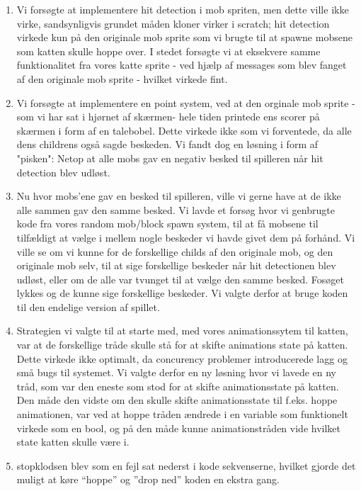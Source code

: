 \documentclass[12pt, a4paper, hidelinks]{article}
\begin{document}
\begin{enumerate}

\item Vi forsøgte at implementere hit detection i mob spriten, men dette ville ikke virke, sandsynligvis grundet måden kloner virker i scratch; hit detection virkede kun på den originale mob sprite som vi brugte til at spawne mobsene som katten skulle hoppe over. I stedet forsøgte vi at eksekvere samme funktionalitet fra vores katte sprite  - ved hjælp af messages som blev fanget af den originale mob sprite - hvilket virkede fint. 


\item Vi forsøgte at implementere en point system, ved at den orginale mob sprite - som vi har sat i hjørnet af skærmen-  hele tiden printede ens scorer på skærmen i form af en talebobel. Dette virkede ikke som vi forventede, da alle dens childrens også sagde beskeden. Vi fandt dog en løsning i form af "pisken": Netop at alle mobs gav en negativ besked til spilleren når hit detection blev udløst.


\item Nu hvor mobs'ene gav en besked til spilleren, ville vi gerne have at de ikke alle sammen gav den samme besked. Vi lavde et forsøg hvor vi genbrugte kode fra vores random mob/block spawn system, til at få mobsene til tilfældigt at vælge i mellem nogle beskeder vi havde givet dem på forhånd. Vi ville se om vi kunne for de forskellige childs af den originale mob, og den originale mob selv, til at sige forskellige beskeder når hit detectionen blev udløst, eller om de alle var tvunget til at vælge den samme besked. Fosøget lykkes og de kunne sige forskellige beskeder. Vi valgte derfor at bruge koden til den endelige version af spillet. 


\item Strategien vi valgte til at starte med, med vores animationssytem til katten, var at de forskellige tråde skulle stå for at skifte animations state på katten. Dette virkede ikke optimalt, da concurency problemer introducerede lagg og små bugs til systemet. Vi valgte derfor en ny løsning hvor vi lavede en ny tråd, som var den eneste som stod for at skifte animationsstate på katten. Den måde den vidste om den skulle skifte animationsstate til f.eks. hoppe animationen, var ved at hoppe tråden ændrede i en variable som funktionelt virkede som en bool, og på den måde kunne animationstråden vide hvilket state katten skulle være i.

\item stopklodsen blev som en fejl sat nederst i kode sekvenserne, hvilket gjorde det muligt at køre ``hoppe'' og ''drop ned'' koden en ekstra gang.



\end{enumerate}
\end{document}
